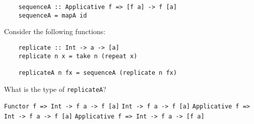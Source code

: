\documentclass[a4paper,10pt,addpoints]{exam}
\begin{document}
\begin{questions}
  \begin{verbatim}
    sequenceA :: Applicative f => [f a] -> f [a]
    sequenceA = mapA id
  \end{verbatim}


  \question[1]

  Consider the following functions:

  \begin{verbatim}
    replicate :: Int -> a -> [a]
    replicate n x = take n (repeat x)

    replicateA n fx = sequenceA (replicate n fx)
  \end{verbatim}

  What is the type of \texttt{replicateA}?

  \begin{choices}
    \choice \texttt{Functor f => Int -> f a -> f [a]}
    \choice \texttt{Int -> f a -> f [a]}
    \choice \texttt{Applicative f => Int -> f a -> f [a]}
    \choice \texttt{Applicative f => Int -> f a -> [f a]}
  \end{choices}

\end{questions}

\newpage
\end{document}
